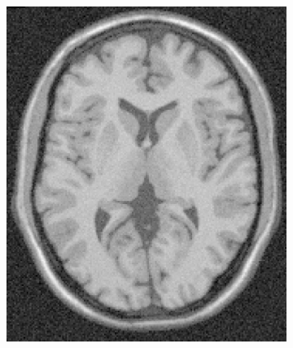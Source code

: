 \documentclass[letterpaper,12pt]{article}
\theoremstyle{plain}
\begin{document}
\begin{figure}[h]
\begin{subfigure}[h]{0.24\linewidth}
         \end{subfigure}
                 \caption{Difererencia entre la imagen original y la imagen binarizada.} 
                 \label{fig:binary_sustraction}
        \begin{subfigure}[h]{0.24\linewidth}
            \centering
            \includegraphics[width=\textwidth]{Figuras/ImageA_exp_gamma=0.5.png}
        \end{subfigure}
        \begin{subfigure}[h]{0.24\linewidth}
            \centering

\end{subfigure}
\end{figure}
\end{document}
